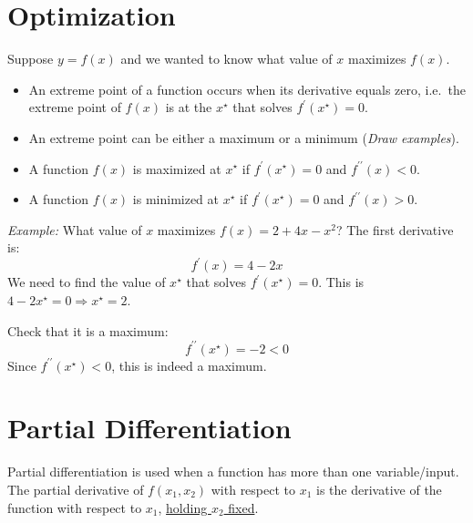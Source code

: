 \documentclass[10pt]{article}
\begin{document}
\section{Optimization}
Suppose $y=f\left( x \right)$ and we wanted to know what value of $x$ maximizes $f\left( x \right)$.

\begin{itemize}
  \item An extreme point of a function occurs when its derivative equals zero,
    i.e.~the extreme point of $f\left( x \right)$ is at the $x^\star$ that
    solves
    $f^\prime\left( x^\star \right)=0$.
  \item An extreme point can be either a maximum or a minimum (\emph{Draw examples}).
  \item A function $f\left( x \right)$ is maximized at $x^\star$ if
    $f^\prime\left( x^\star \right)=0$ and $f^{\prime\prime}\left( x \right)
    < 0$.
  \item A function $f\left( x \right)$ is minimized at $x^\star$ if
    $f^\prime\left( x^\star \right)=0$ and $f^{\prime\prime}\left( x \right)
    > 0$.
\end{itemize}
\emph{Example:} What value of $x$ maximizes $f\left( x \right)=2 + 4x - x^2$?
The first derivative is:
\[
  f^\prime\left( x \right)=4 - 2x
\]
We need to find the value of $x^\star$ that solves $f^\prime\left( x^\star
\right)=0$. This is $4-2x^\star=0 \Longrightarrow x^\star=2$.

Check that it is a maximum:
\[
  f^{\prime\prime}\left( x^\star \right)= -2 < 0
\]
Since $f^{\prime\prime}\left( x^\star \right) < 0$, this is indeed a maximum.


\section{Partial Differentiation}
Partial differentiation is used when a function has more than one
variable/input. The partial derivative of $f\left( x_1,x_2 \right)$ with
respect to $x_1$ is the derivative of the function with respect to $x_1$,
\underline{holding $x_2$ fixed}.
\end{document}
